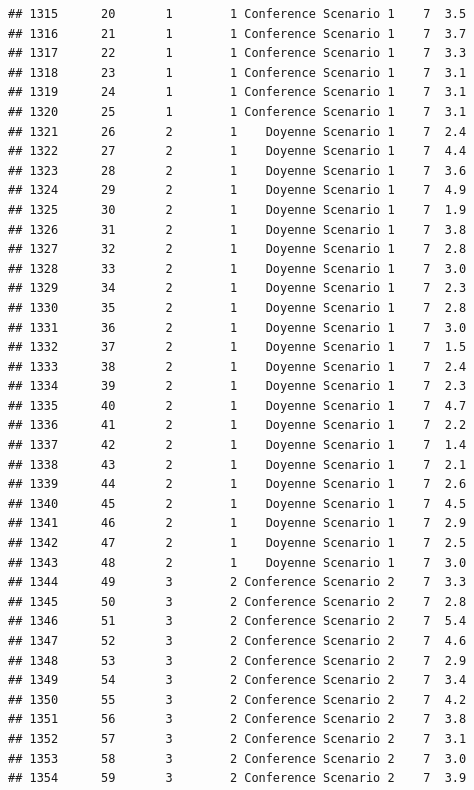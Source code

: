 \documentclass[
]{article}
\begin{document}
\begin{verbatim}
## 1315      20       1        1 Conference Scenario 1    7  3.5
## 1316      21       1        1 Conference Scenario 1    7  3.7
## 1317      22       1        1 Conference Scenario 1    7  3.3
## 1318      23       1        1 Conference Scenario 1    7  3.1
## 1319      24       1        1 Conference Scenario 1    7  3.1
## 1320      25       1        1 Conference Scenario 1    7  3.1
## 1321      26       2        1    Doyenne Scenario 1    7  2.4
## 1322      27       2        1    Doyenne Scenario 1    7  4.4
## 1323      28       2        1    Doyenne Scenario 1    7  3.6
## 1324      29       2        1    Doyenne Scenario 1    7  4.9
## 1325      30       2        1    Doyenne Scenario 1    7  1.9
## 1326      31       2        1    Doyenne Scenario 1    7  3.8
## 1327      32       2        1    Doyenne Scenario 1    7  2.8
## 1328      33       2        1    Doyenne Scenario 1    7  3.0
## 1329      34       2        1    Doyenne Scenario 1    7  2.3
## 1330      35       2        1    Doyenne Scenario 1    7  2.8
## 1331      36       2        1    Doyenne Scenario 1    7  3.0
## 1332      37       2        1    Doyenne Scenario 1    7  1.5
## 1333      38       2        1    Doyenne Scenario 1    7  2.4
## 1334      39       2        1    Doyenne Scenario 1    7  2.3
## 1335      40       2        1    Doyenne Scenario 1    7  4.7
## 1336      41       2        1    Doyenne Scenario 1    7  2.2
## 1337      42       2        1    Doyenne Scenario 1    7  1.4
## 1338      43       2        1    Doyenne Scenario 1    7  2.1
## 1339      44       2        1    Doyenne Scenario 1    7  2.6
## 1340      45       2        1    Doyenne Scenario 1    7  4.5
## 1341      46       2        1    Doyenne Scenario 1    7  2.9
## 1342      47       2        1    Doyenne Scenario 1    7  2.5
## 1343      48       2        1    Doyenne Scenario 1    7  3.0
## 1344      49       3        2 Conference Scenario 2    7  3.3
## 1345      50       3        2 Conference Scenario 2    7  2.8
## 1346      51       3        2 Conference Scenario 2    7  5.4
## 1347      52       3        2 Conference Scenario 2    7  4.6
## 1348      53       3        2 Conference Scenario 2    7  2.9
## 1349      54       3        2 Conference Scenario 2    7  3.4
## 1350      55       3        2 Conference Scenario 2    7  4.2
## 1351      56       3        2 Conference Scenario 2    7  3.8
## 1352      57       3        2 Conference Scenario 2    7  3.1
## 1353      58       3        2 Conference Scenario 2    7  3.0
## 1354      59       3        2 Conference Scenario 2    7  3.9

\end{verbatim}
\end{document}
